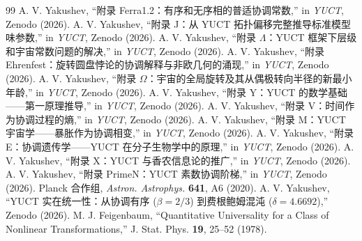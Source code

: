 \documentclass[12pt,a4paper]{article}
\begin{document}
	\begin{thebibliography}{99}
		 A. V. Yakushev, ``附录 Ferra1.2：有序和无序相的普适协调常数,'' in \emph{YUCT}, Zenodo (2026).
		 A. V. Yakushev, ``附录 J：从 YUCT 拓扑偏移完整推导标准模型味参数,'' in \emph{YUCT}, Zenodo (2026).
		 A. V. Yakushev, ``附录 \(\Lambda\)：YUCT 框架下层级和宇宙常数问题的解决,'' in \emph{YUCT}, Zenodo (2026).
		 A. V. Yakushev, ``附录 Ehrenfest：旋转圆盘悖论的协调解释与非欧几何的涌现,'' in \emph{YUCT}, Zenodo (2026).
		 A. V. Yakushev, ``附录 \(\Omega\)：宇宙的全局旋转及其从偶极转向半径的新最小年龄,'' in \emph{YUCT}, Zenodo (2026).
		 A. V. Yakushev, ``附录 Y：YUCT 的数学基础——第一原理推导,'' in \emph{YUCT}, Zenodo (2026).
		 A. V. Yakushev, ``附录 V：时间作为协调过程的熵,'' in \emph{YUCT}, Zenodo (2026).
		 A. V. Yakushev, ``附录 M：YUCT 宇宙学——暴胀作为协调相变,'' in \emph{YUCT}, Zenodo (2026).
		 A. V. Yakushev, ``附录 E：协调遗传学——YUCT 在分子生物学中的原理,'' in \emph{YUCT}, Zenodo (2026).
		 A. V. Yakushev, ``附录 X：YUCT 与香农信息论的推广,'' in \emph{YUCT}, Zenodo (2026).
		 A. V. Yakushev, ``附录 PrimeN：YUCT 素数协调阶梯,'' in \emph{YUCT}, Zenodo (2026).
		 Planck 合作组, \emph{Astron. Astrophys.} \textbf{641}, A6 (2020).
		 A. V. Yakushev, ``YUCT 实在统一性：从协调有序 (\(\beta = 2/3\)) 到费根鲍姆混沌 (\(\delta = 4.6692\)),'' Zenodo (2026).
		 M. J. Feigenbaum, ``Quantitative Universality for a Class of Nonlinear Transformations,'' J. Stat. Phys. \textbf{19}, 25–52 (1978).
	\end{thebibliography}
	
\end{document}
